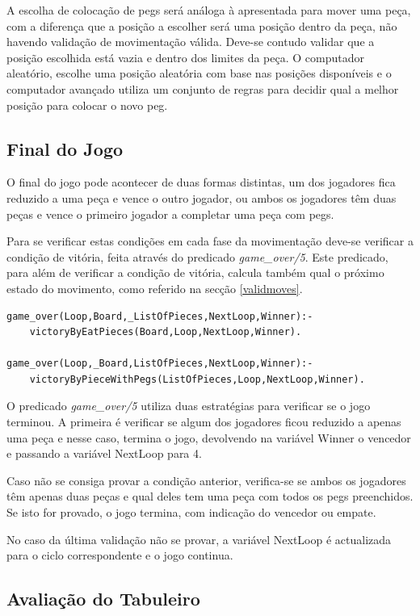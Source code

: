 \documentclass[paper=a4, fontsize=11pt]{scrartcl} %
\numberwithin{equation}{section} %
\numberwithin{figure}{section} %
\numberwithin{table}{section} %
\begin{document}
A escolha de colocação de pegs será análoga à apresentada para mover uma peça, com a diferença que a posição a escolher será uma posição dentro da peça, não havendo validação de movimentação válida. Deve-se contudo validar que a posição escolhida está vazia e dentro dos limites da peça. O computador aleatório, escolhe uma posição aleatória com base nas posições disponíveis e o computador avançado utiliza um conjunto de regras para decidir qual a melhor posição para colocar o novo peg.

\subsection{Final do Jogo}

O final do jogo pode acontecer de duas formas distintas, um dos jogadores fica reduzido a uma peça e vence o outro jogador, ou ambos os jogadores têm duas peças e vence o primeiro jogador a completar uma peça com pegs.

Para se verificar estas condições em cada fase da movimentação deve-se verificar a condição de vitória, feita através do predicado \textit{game\_over/5}. Este predicado, para além de verificar a condição de vitória, calcula também qual o próximo estado do movimento, como referido na secção \ref{validmoves}.

\begin{lstlisting}
game_over(Loop,Board,_ListOfPieces,NextLoop,Winner):-
	victoryByEatPieces(Board,Loop,NextLoop,Winner).

game_over(Loop,_Board,ListOfPieces,NextLoop,Winner):-
	victoryByPieceWithPegs(ListOfPieces,Loop,NextLoop,Winner).
\end{lstlisting}

O predicado \textit{game\_over/5} utiliza duas estratégias para verificar se o jogo terminou. A primeira é verificar se algum dos jogadores ficou reduzido a apenas uma peça e nesse caso, termina o jogo, devolvendo na variável Winner o vencedor e passando a variável NextLoop para 4. 

Caso não se consiga provar a condição anterior, verifica-se se ambos os jogadores têm apenas duas peças e qual deles tem uma peça com todos os pegs preenchidos. Se isto for provado, o jogo termina, com indicação do vencedor ou empate.

No caso da última validação não se provar, a variável NextLoop é actualizada para o ciclo correspondente e o jogo continua.

\subsection{Avaliação do Tabuleiro} \label{avtab}
\end{document}
